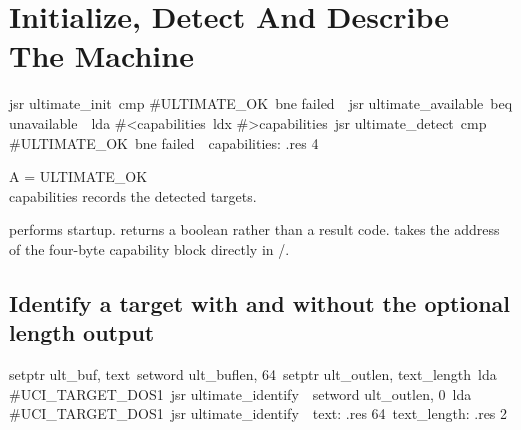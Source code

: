 
\section{Initialize, Detect And Describe The Machine}

\begin{listingbox}
\hspace*{2em}jsr ultimate\_init\
\hspace*{2em}cmp \#ULTIMATE\_OK\
\hspace*{2em}bne failed\
\
\hspace*{2em}jsr ultimate\_available\
\hspace*{2em}beq unavailable\
\
\hspace*{2em}lda \#<capabilities\
\hspace*{2em}ldx \#>capabilities\
\hspace*{2em}jsr ultimate\_detect\
\hspace*{2em}cmp \#ULTIMATE\_OK\
\hspace*{2em}bne failed\
\
capabilities: .res 4
\end{listingbox}

\begin{resultbox}
A = ULTIMATE_OK\\
capabilities records the detected targets.
\end{resultbox}

\cmd{ultimate\_init} performs startup.  returns a
boolean rather than a result code.  takes the address of
the four-byte capability block directly in /.

\subsection*{Identify a target with and without the optional length output}

\begin{listingbox}
\hspace*{2em}setptr ult\_buf, text\
\hspace*{2em}setword ult\_buflen, 64\
\hspace*{2em}setptr ult\_outlen, text\_length\
\hspace*{2em}lda \#UCI\_TARGET\_DOS1\
\hspace*{2em}jsr ultimate\_identify\
\
\hspace*{2em}setword ult\_outlen, 0\
\hspace*{2em}lda \#UCI\_TARGET\_DOS1\
\hspace*{2em}jsr ultimate\_identify\
\
text:        .res 64\
text\_length: .res 2
\end{listingbox}

